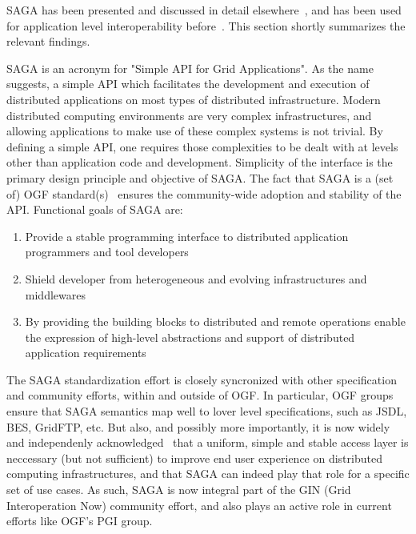 \documentclass[10pt,conference,final,letterpaper,twoside,twocolumn,]{IEEEtran}
\begin{document}
 SAGA has been presented and discussed in detail
 elsewhere~\cite{sagapub...}, and has been used for application level
 interoperability before~\cite{sagainterop...}.  This section shortly
 summarizes the relevant findings.

 SAGA is an acronym for "Simple API for Grid Applications". As the
 name suggests, a simple API which facilitates the development and
 execution of distributed applications on most types of distributed
 infrastructure.  Modern distributed computing environments are very
 complex infrastructures, and allowing applications to make use of
 these complex systems is not trivial.  By defining a simple API, one
 requires those complexities to be dealt with at levels other than
 application code and development.  Simplicity of the interface is the
 primary design principle and objective of SAGA.  The fact that SAGA
 is a (set of) OGF standard(s)~\cite{sagaspecs...} ensures the
 community-wide adoption and stability of the API.  Functional goals
 of SAGA are:

 \begin{enumerate}

  \item Provide a stable programming interface to distributed
  application programmers and tool developers
 
  \item Shield developer from heterogeneous and evolving
  infrastructures and middlewares

  \item By providing the building blocks to distributed and remote
  operations enable the expression of high-level abstractions and
  support of distributed application requirements

 \end{enumerate}

 The SAGA standardization effort is closely syncronized with other
 specification and community efforts, within and outside of OGF.  In
 particular, OGF groups ensure that SAGA semantics map well to lover
 level specifications, such as JSDL, BES, GridFTP, etc.   But also,
 and possibly more importantly, it is now widely and independenly
 acknowledged~\cite{XD,EGI,UMD,Naregi} that a uniform, simple and
 stable access layer is neccessary (but not sufficient) to improve end
 user experience on distributed computing infrastructures, and that
 SAGA can indeed play that role for a specific set of use cases.  As
 such, SAGA is now integral part of the GIN (Grid Interoperation Now)
 community effort, and also plays an active role in current efforts
 like OGF's PGI group. %
  
\end{document}

